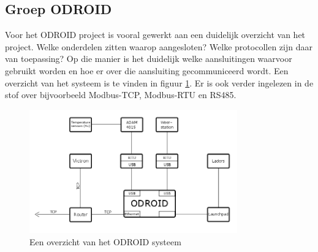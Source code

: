 \subsection*{Groep ODROID}
Voor het ODROID project is vooral gewerkt aan een duidelijk overzicht van het project. Welke onderdelen zitten waarop aangesloten? Welke protocollen zijn daar van toepassing? Op die manier is het duidelijk welke aansluitingen waarvoor gebruikt worden en hoe er over die aansluiting gecommuniceerd wordt. Een overzicht van het systeem is te vinden in figuur \ref{fig:ODROID}. Er is ook verder ingelezen in de stof over bijvoorbeeld Modbus-TCP, Modbus-RTU en RS485.

\begin{figure}[htbp]
\centering
\includegraphics[width=0.8\textwidth]{ODROID_overview.png}
\caption{Een overzicht van het ODROID systeem}\label{fig:ODROID}
\end{figure}